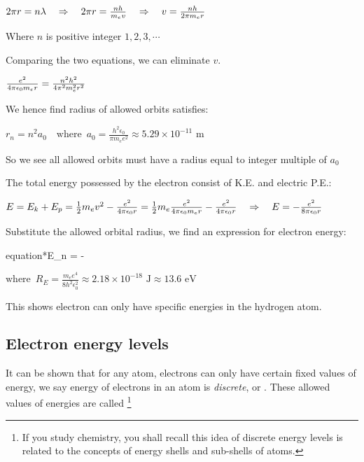 {
	
	\centering
	
	$2\pi r  = n \lambda \quad \Rightarrow \quad 2\pi r = \frac{nh}{m_e v} \quad \Rightarrow \quad v = \frac{nh}{2\pi m_e r}$
	
}

\noindent Where $n$ is positive integer $1,2,3,\cdots$

Comparing the two equations, we can eliminate $v$.

{
	
	\centering
	
	$\frac{e^2}{4\pi\epsilon_0 m_e r} = \frac{n^2 h^2}{4\pi^2 m_e^2 r^2}$
	
}

We hence find radius of allowed orbits satisfies:

{
	
	\centering
	
	$\boxed{r_n = n^2 a_0} \quad \text{where }\, a_0 = \frac{h^2 \epsilon_0}{\pi m_e e^2} \approx 5.29 \times 10^{-11} \text{ m}$
	
}

\noindent So we see all allowed orbits must have a radius equal to integer multiple of $a_0$

The total energy possessed by the electron consist of K.E. and electric P.E.:

{
	
	\centering
	
	$E = E_k + E_p = \frac{1}{2}m_e v^2 - \frac{e^2}{4\pi\epsilon_0 r} = \frac{1}{2}m_e \frac{e^2}{4\pi\epsilon_0 m_e r} - \frac{e^2}{4\pi\epsilon_0 r} \quad \Rightarrow \quad E = -\frac{e^2}{8\pi\epsilon_0 r}$
	
}

Substitute the allowed orbital radius, we find an expression for electron energy:

{
	
	\centering
	
	\begin{empheq}[box=\tcbhighmath]{equation*}{E_n = -} \end{empheq} $\text{where }\, R_E = \frac{m_e e^4}{8 h^2 \epsilon_0^2} \approx 2.18\times10^{-18} \text{ J} \approx 13.6 \text{ eV}$
	
}

This shows electron can only have specific energies in the hydrogen atom.



\subsection{Electron energy levels}
It can be shown that for any atom, electrons can only have certain fixed values of energy, we say energy of electrons in an atom is \emph{discrete}, or . These allowed values of energies are called \footnote[][-3cm]{If you study chemistry, you shall recall this idea of discrete energy levels is related to the concepts of energy shells and sub-shells of atoms.}

